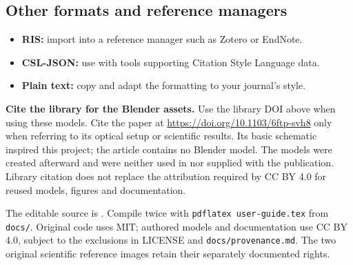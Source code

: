 \documentclass[11pt,a4paper]{article}
\begin{document}
\subsection*{Other formats and reference managers}
\begin{itemize}[leftmargin=*,itemsep=3pt]
\item \textbf{RIS:} import  into a reference manager such as Zotero or EndNote.
\item \textbf{CSL-JSON:} use  with tools supporting Citation Style Language data.
\item \textbf{Plain text:} copy  and adapt the formatting to your journal's style.
\end{itemize}
\textbf{Cite the library for the Blender assets.} Use the library DOI above when using these models. Cite the paper at \url{https://doi.org/10.1103/6ftp-svh8} only when referring to its optical setup or scientific results. Its basic schematic inspired this project; the article contains no Blender model. The models were created afterward and were neither used in nor supplied with the publication. Library citation does not replace the attribution required by CC BY 4.0 for reused models, figures and documentation.


The editable source is . Compile twice with \texttt{pdflatex user-guide.tex} from \texttt{docs/}. Original code uses MIT; authored models and documentation use CC BY 4.0, subject to the exclusions in LICENSE and \texttt{docs/provenance.md}. The two original scientific reference images retain their separately documented rights.
\end{document}
